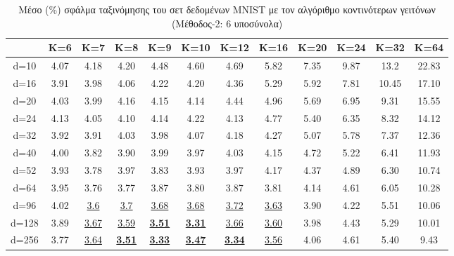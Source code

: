 \newpage{}
\begin{table}[H]
\centering
\singlespacing
\label{tab:table1}
\caption{Μέσο (\%) σφάλμα ταξινόμησης του σετ δεδομένων \textlatin{MNIST} με τον αλγόριθμο κοντινότερων γειτόνων (Μέθοδος-2: 6 υποσύνολα)}
\vspace*{5mm}
\begin{tabular}{|c|c|c|c|c|c|c|c|c|c|c|c|}
\hline
& K=6 & K=7 & K=8 & K=9 & K=10 & K=12 & K=16 & K=20 & K=24 & K=32 & K=64 \\
\hline
d=10 & 4.07 & 4.18 & 4.20 & 4.48 & 4.60 & 4.69 & 5.82 & 7.35 & 9.87 & 13.2 & 22.83 \\
d=16 & 3.91 & 3.98 & 4.06 & 4.22 & 4.20 & 4.36 & 5.29 & 5.92 & 7.81 & 10.45 & 17.10 \\
d=20 & 4.03 & 3.99 & 4.16 & 4.15 & 4.14 & 4.44 & 4.96 & 5.69 & 6.95 & 9.31 & 15.55 \\
d=24 & 4.13 & 4.05 & 4.10 & 4.14 & 4.22 & 4.13 & 4.77 & 5.40 & 6.35 & 8.32 & 14.12 \\
d=32 & 3.92 & 3.91 & 4.03 & 3.98 & 4.07 & 4.18 & 4.27 & 5.07 & 5.78 & 7.37 & 12.36 \\
d=40 & 4.00 & 3.82 & 3.90 & 3.99 & 3.97 & 4.03 & 4.15 & 4.72 & 5.22 & 6.41 & 11.93 \\
d=52 & 3.93 & 3.78 & 3.97 & 3.83 & 3.93 & 3.97 & 4.17 & 4.37 & 4.89 & 6.30 & 10.74 \\
d=64 & 3.95 & 3.76 & 3.77 & 3.87 & 3.80 & 3.87 & 3.81 & 4.14 & 4.61 & 6.05 & 10.28 \\
d=96 & 4.02 & \underline{3.6} & \underline{3.7} & \underline{3.68} & \underline{3.68} & \underline{3.72} & \underline{3.63} & 3.90 & 4.22 & 5.51 & 10.06 \\
d=128 & 3.89 & \underline{3.67} & \underline{3.59} & \textbf{\underline{3.51}} & \textbf{\underline{3.31}} & \underline{3.66} & \underline{3.60} & 3.98 & 4.43 & 5.29 & 10.01 \\
d=256 & 3.77 & \underline{3.64} & \textbf{\underline{3.51}} & \textbf{\underline{3.33}} & \textbf{\underline{3.47}} & \textbf{\underline{3.34}} & \underline{3.56} & 4.06 & 4.61 & 5.40 & 9.43 \\
\hline
\end{tabular}
\end{table}

